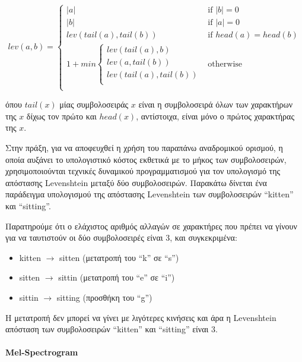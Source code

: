 \[
lev(a,b) = \begin{cases}
|a| & \text{if } |b| = 0 \\
|b| & \text{if } |a| = 0 \\
lev(tail(a), tail(b)) & \text{if } head(a) = head(b) \\
1 + min \begin{cases}  lev(tail(a),b) \\
								lev(a,tail(b)) \\
								lev(tail(a),tail(b)) \\
			\end{cases} & \text{otherwise} \\
			\end{cases}
\]

όπου $tail(x)$ μίας συμβολοσειράς $x$ είναι η συμβολοσειρά όλων των χαρακτήρων της $x$ δίχως τον πρώτο και $head(x)$, αντίστοιχα, είναι μόνο ο πρώτος χαρακτήρας της $x$.

Στην πράξη, για να αποφευχθεί η χρήση του παραπάνω αναδρομικού ορισμού, η οποία αυξάνει το υπολογιστικό κόστος εκθετικά με το μήκος των συμβολοσειρών, χρησιμοποιούνται τεχνικές δυναμικού προγραμματισμού για τον υπολογισμό της απόστασης Levenshtein μεταξύ δύο συμβολοσειρών. Παρακάτω δίνεται ένα παράδειγμα υπολογισμού της απόστασης Levenshtein των συμβολοσειρών ``kitten'' και ``sitting''.

Παρατηρούμε ότι ο ελάχιστος αριθμός αλλαγών σε χαρακτήρες που πρέπει να γίνουν για να ταυτιστούν οι δύο συμβολοσειρές είναι 3, και συγκεκριμένα:

\begin{itemize}
\item kitten $\rightarrow$ sitten (μετατροπή του ``k'' σε ``s'')
\item sitten $\rightarrow$ sittin (μετατροπή του ``e'' σε ``i'')
\item sittin $\rightarrow$ sitting (προσθήκη του ``g'')
\end{itemize}

Η μετατροπή δεν μπορεί να γίνει με λιγότερες κινήσεις και άρα η Levenshtein απόσταση των συμβολοσειρών ``kitten'' και ``sitting'' είναι 3.

\paragraph{Mel-Spectrogram}

